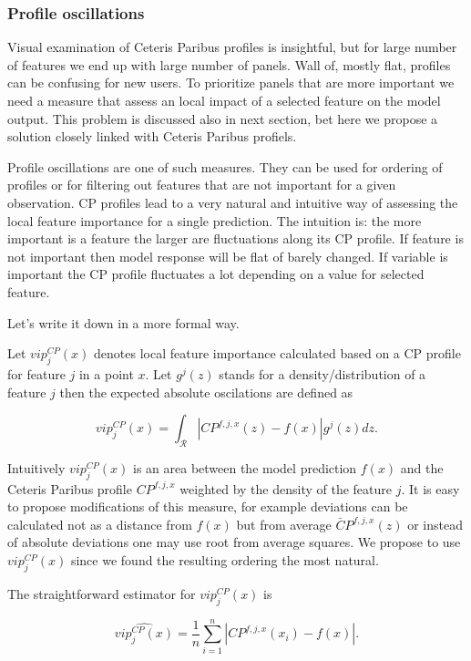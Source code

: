 \documentclass[]{krantz}
\theoremstyle{definition}
\theoremstyle{definition}
\theoremstyle{definition}
\theoremstyle{remark}
\begin{document}
\hypertarget{oscillations}{%
\subsubsection{Profile oscillations}\label{oscillations}}

Visual examination of Ceteris Paribus profiles is insightful, but for
large number of features we end up with large number of panels. Wall of,
mostly flat, profiles can be confusing for new users. To prioritize
panels that are more important we need a measure that assess an local
impact of a selected feature on the model output. This problem is
discussed also in next section, bet here we propose a solution closely
linked with Ceteris Paribus profiels.

Profile oscillations are one of such measures. They can be used for
ordering of profiles or for filtering out features that are not
important for a given observation. CP profiles lead to a very natural
and intuitive way of assessing the local feature importance for a single
prediction. The intuition is: the more important is a feature the larger
are fluctuations along its CP profile. If feature is not important then
model response will be flat of barely changed. If variable is important
the CP profile fluctuates a lot depending on a value for selected
feature.

Let's write it down in a more formal way.

Let \(vip^{CP}_j(x)\) denotes local feature importance calculated based
on a CP profile for feature \(j\) in a point \(x\). Let \(g^j(z)\)
stands for a density/distribution of a feature \(j\) then the expected
absolute oscilations are defined as

\[
vip^{CP}_j(x) = \int_{\mathcal R} |CP^{f,j,x}(z) - f(x)| g^j(z)dz.
\]

Intuitively \(vip^{CP}_j(x)\) is an area between the model prediction
\(f(x)\) and the Ceteris Paribus profile \(CP^{f,j,x}\) weighted by the
density of the feature \(j\). It is easy to propose modifications of
this measure, for example deviations can be calculated not as a distance
from \(f(x)\) but from average \(\bar CP^{f,j,x}(z)\) or instead of
absolute deviations one may use root from average squares. We propose to
use \(vip^{CP}_j(x)\) since we found the resulting ordering the most
natural.

The straightforward estimator for \(vip^{CP}_j(x)\) is

\[
\widehat{ vip^{CP}_j(x)} = \frac 1n \sum_{i=1}^n |CP^{f,j,x}(x_i) - f(x)|.
\]
\end{document}
